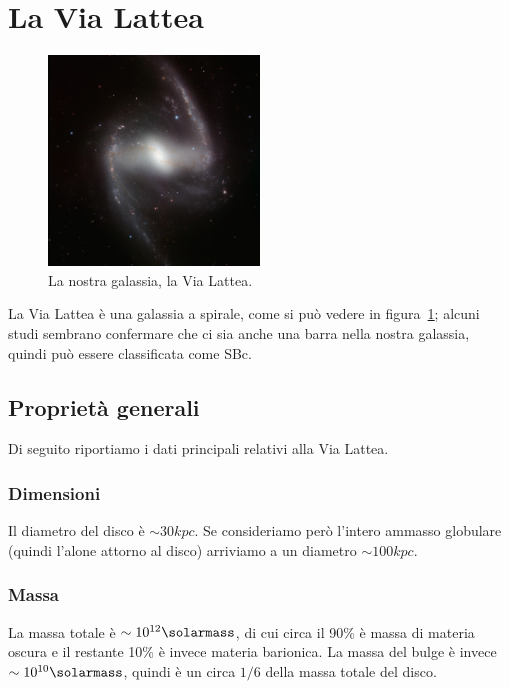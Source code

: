 \section{La Via Lattea}\label{sec:via-lattea}
\begin{figure}
    \centering
    \includegraphics[width = 0.5\textwidth]{immagini/via-lattea.png}
    \caption{La nostra galassia, la Via Lattea.}
    \label{fig:via-lattea}
\end{figure}

La Via Lattea è una galassia a spirale, come si può vedere in figura~\ref{fig:via-lattea}; alcuni studi sembrano confermare che ci sia anche una barra nella nostra galassia, quindi può essere classificata come SBc. 

\subsection{Proprietà generali}
Di seguito riportiamo i dati principali relativi alla Via Lattea.

\subsubsection{Dimensioni}
Il diametro del disco è $\sim 30 kpc$. Se consideriamo però l'intero ammasso globulare (quindi l'alone attorno al disco) arriviamo a un diametro $\sim 100 kpc$.

\subsubsection{Massa}
La massa totale è $\sim 10^{12} \si{\solarmass}$, di cui circa il 90\% è massa di materia oscura e il restante 10\% è invece materia barionica. 
La massa del bulge è invece $\sim 10^{10} \si{\solarmass}$, quindi è un circa $1/6$ della massa totale del disco.

